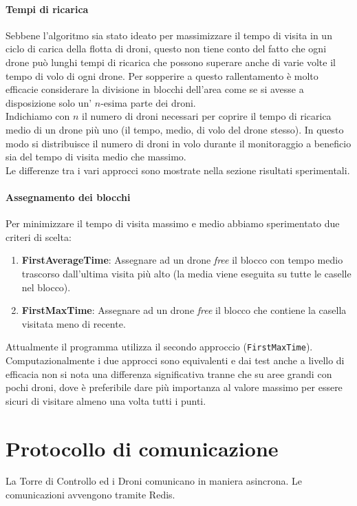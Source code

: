 \documentclass[a4paper, 11pt]{article}
\begin{document}
\paragraph*{Tempi di ricarica}
Sebbene l'algoritmo sia stato ideato per massimizzare il tempo di visita in un ciclo di carica della flotta di droni, questo non tiene conto del fatto che ogni drone può lunghi tempi di ricarica che possono superare anche di varie volte il tempo di volo di ogni drone.
Per sopperire a questo rallentamento è molto efficacie considerare la divisione in blocchi dell'area come se si avesse a disposizione solo un' $n$-esima parte dei droni.\\
Indichiamo con $n$ il numero di droni necessari per coprire il tempo di ricarica medio di un drone più uno (il tempo, medio, di volo del drone stesso). 
In questo modo si distribuisce il numero di droni in volo durante il monitoraggio a beneficio sia del tempo di visita medio che massimo.\\
Le differenze tra i vari approcci sono mostrate nella sezione risultati sperimentali.

\paragraph*{Assegnamento dei blocchi}
Per minimizzare il tempo di visita massimo e medio abbiamo sperimentato due criteri di scelta:
\begin{enumerate}
    \item \textbf{FirstAverageTime}: Assegnare ad un drone \textit{free} il blocco con tempo medio trascorso dall'ultima visita più alto (la media viene eseguita su tutte le caselle nel blocco).
    
    \item \textbf{FirstMaxTime}: Assegnare ad un drone \textit{free} il blocco che contiene la casella visitata meno di recente.
\end{enumerate}
Attualmente il programma utilizza il secondo approccio (\verb|FirstMaxTime|). Computazionalmente i due approcci sono equivalenti e dai test anche a livello di efficacia non si nota una differenza significativa 
tranne che su aree grandi con pochi droni, dove è preferibile dare più importanza al valore massimo per essere sicuri di visitare almeno una volta tutti i punti.
\section{Protocollo di comunicazione}
La Torre di Controllo ed i Droni comunicano in maniera asincrona. Le comunicazioni avvengono tramite Redis.
\end{document}
